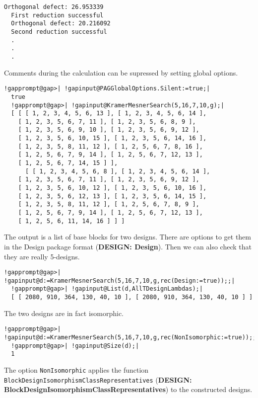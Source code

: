 \documentclass[a4paper,11pt]{report}
\begin{document}
{{\begin{Verbatim}[commandchars=@|A,fontsize=\small,frame=single,label=Example]
  Orthogonal defect: 26.953339
  First reduction successful
  Orthogonal defect: 20.216092
  Second reduction successful
  .
  .
  .
\end{Verbatim}
 Comments during the calculation can be supressed by setting global options. 
\begin{Verbatim}[commandchars=!@|,fontsize=\small,frame=single,label=Example]
  !gapprompt@gap>| !gapinput@PAGGlobalOptions.Silent:=true;|
  true
  !gapprompt@gap>| !gapinput@KramerMesnerSearch(5,16,7,10,g);|
  [ [ [ 1, 2, 3, 4, 5, 6, 13 ], [ 1, 2, 3, 4, 5, 6, 14 ], 
  	[ 1, 2, 3, 5, 6, 7, 11 ], [ 1, 2, 3, 5, 6, 8, 9 ], 
  	[ 1, 2, 3, 5, 6, 9, 10 ], [ 1, 2, 3, 5, 6, 9, 12 ], 
  	[ 1, 2, 3, 5, 6, 10, 15 ], [ 1, 2, 3, 5, 6, 14, 16 ], 
  	[ 1, 2, 3, 5, 8, 11, 12 ], [ 1, 2, 5, 6, 7, 8, 16 ], 
  	[ 1, 2, 5, 6, 7, 9, 14 ], [ 1, 2, 5, 6, 7, 12, 13 ], 
  	[ 1, 2, 5, 6, 7, 14, 15 ] ], 
      [ [ 1, 2, 3, 4, 5, 6, 8 ], [ 1, 2, 3, 4, 5, 6, 14 ], 
  	[ 1, 2, 3, 5, 6, 7, 11 ], [ 1, 2, 3, 5, 6, 9, 12 ], 
  	[ 1, 2, 3, 5, 6, 10, 12 ], [ 1, 2, 3, 5, 6, 10, 16 ], 
  	[ 1, 2, 3, 5, 6, 12, 13 ], [ 1, 2, 3, 5, 6, 14, 15 ], 
  	[ 1, 2, 3, 5, 8, 11, 12 ], [ 1, 2, 5, 6, 7, 8, 9 ], 
  	[ 1, 2, 5, 6, 7, 9, 14 ], [ 1, 2, 5, 6, 7, 12, 13 ], 
  	[ 1, 2, 5, 6, 11, 14, 16 ] ] ]
\end{Verbatim}
 The output is a list of base blocks for two designs. There are options to get
them in the \textsf{Design} package format  (\textbf{DESIGN: Design}). Then we can also check that they are really 5-designs. 
\begin{Verbatim}[commandchars=!@|,fontsize=\small,frame=single,label=Example]
  !gapprompt@gap>| !gapinput@d:=KramerMesnerSearch(5,16,7,10,g,rec(Design:=true));;|
  !gapprompt@gap>| !gapinput@List(d,AllTDesignLambdas);|
  [ [ 2080, 910, 364, 130, 40, 10 ], [ 2080, 910, 364, 130, 40, 10 ] ]
\end{Verbatim}
 The two designs are in fact isomorphic. 
\begin{Verbatim}[commandchars=!@|,fontsize=\small,frame=single,label=Example]
  !gapprompt@gap>| !gapinput@d:=KramerMesnerSearch(5,16,7,10,g,rec(NonIsomorphic:=true));;|
  !gapprompt@gap>| !gapinput@Size(d);|
  1
\end{Verbatim}
 The option \texttt{NonIsomorphic} applies the function \texttt{BlockDesignIsomorphismClassRepresentatives} (\textbf{DESIGN: BlockDesignIsomorphismClassRepresentatives}) to the constructed designs. }

 
}
\end{document}
